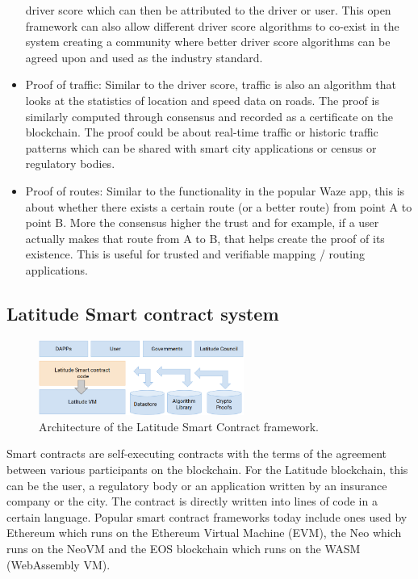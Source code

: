 \begin{itemize}
         driver score which can then be attributed to the driver or user. This open framework can also allow different
         driver score algorithms to co-exist in the system creating a community where better driver score algorithms can
         be agreed upon and used as the industry standard.
     \item Proof of traffic:  Similar to the driver score, traffic is also an algorithm that looks at the statistics of
         location and speed data on roads. The proof is similarly computed through consensus and recorded as a
         certificate on the blockchain. The proof could be about real-time traffic or historic traffic patterns which
         can be shared with smart city applications or census or regulatory bodies.
     \item Proof of routes: Similar to the functionality in the popular Waze app, this is about whether there exists a
         certain route (or a better route) from point A to point B. More the consensus higher the trust and for example,
         if a user actually makes that route from A to B, that helps create the proof of its existence. This is useful
         for trusted and verifiable mapping / routing applications.
 \end{itemize}
\subsection{Latitude Smart contract system}

\begin{figure}[t]
    \centering
    \includegraphics[width=0.60\textwidth]{lat_sc.png}
  \caption{Architecture of the Latitude Smart Contract framework.}
    \label{fig:lat-sc}
\end{figure}

Smart contracts are self-executing contracts with the terms of the agreement between various participants on the
blockchain. For the Latitude blockchain, this can be the user, a regulatory body or an application written by an
insurance company or the city. The contract is directly written into lines of code in a certain language. Popular smart
contract frameworks today include ones used by Ethereum which runs on the Ethereum Virtual Machine (EVM), the Neo which
runs on the NeoVM and the EOS blockchain which runs on the WASM (WebAssembly VM).

